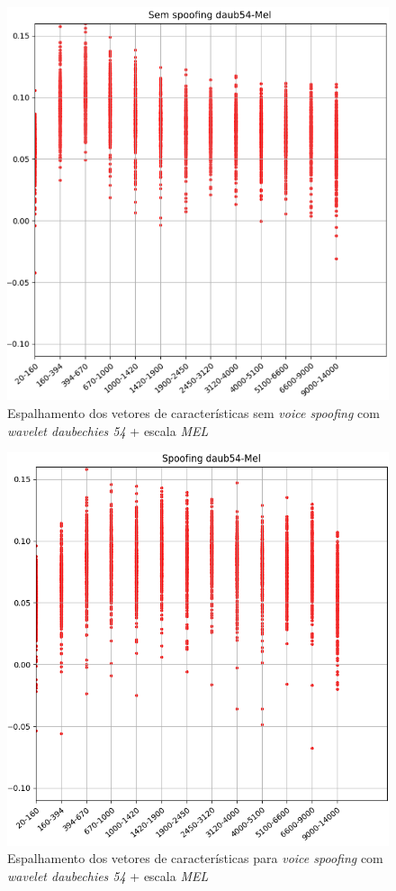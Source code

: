 \begin{figure}[!h]
	\centering
	\includegraphics[width=.70\linewidth, height=.68\linewidth]{images/results/barkVersusMel/liveDaub54Mel}
	\caption{Espalhamento dos vetores de características sem \textit{voice spoofing} com \textit{wavelet daubechies 54} + escala \textit{MEL} }
	\label{fig:livedaub54mel}
\end{figure}

\begin{figure}[!h]
	\centering
	\includegraphics[width=.70\linewidth, height=.68\linewidth]{images/results/barkVersusMel/spoofingDaub54Mel}
	\caption{Espalhamento dos vetores de características para \textit{voice spoofing} com \textit{wavelet daubechies 54} + escala \textit{MEL} }
	\label{fig:spoofingdaub54mel}
\end{figure}